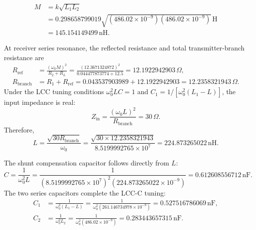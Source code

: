 \documentclass[11pt,a4paper]{article}
\newcommand{\step}[1]{\par\vspace{8pt}{\large\bfseries #1}\par\vspace{2pt}}
\newcommand{\ohm}{\,\Omega}
\newcommand{\nH}{\,\mathrm{nH}}
\newcommand{\nF}{\,\mathrm{nF}}
\begin{document}
\step{4. Mutual inductance M}
\begin{align*}
 M&=k\sqrt{L_1L_2}\\
  &=0.298658799019\sqrt{(486.02\times10^{-9})(486.02\times10^{-9})}\,\mathrm{H}\\
  &=\boxed{145.154149499\nH}.
\end{align*}

\newpage
\step{5. Reflected resistance and compensation inductance L}
At receiver series resonance, the reflected resistance and total
transmitter-branch resistance are
\begin{align*}
 R_{\mathrm{ref}}
   &=\frac{(\omega_0M)^2}{R_2+R_L}
     =\frac{(12.3671324872)^2}{0.044477873774+12.5}
     =12.1922942903\ohm,\\
 R_{\mathrm{branch}}
   &=R_1+R_{\mathrm{ref}}
     =0.043537903989+12.1922942903
     =12.2358321943\ohm.
\end{align*}
Under the LCC tuning conditions
$\omega_0^2LC=1$ and $C_1=1/[\omega_0^2(L_1-L)]$,
the input impedance is real:
\[
 Z_{\mathrm{in}}=\frac{(\omega_0L)^2}{R_{\mathrm{branch}}}=30\ohm.
\]
Therefore,
\[
 L=\frac{\sqrt{30R_{\mathrm{branch}}}}{\omega_0}
  =\frac{\sqrt{30\times12.2358321943}}{8.5199992765\times10^7}
  =\boxed{224.873265022\nH}.
\]

\step{6. Compensation capacitances C, C1 and C2}
The shunt compensation capacitor follows directly from $L$:
\[
 C=\frac{1}{\omega_0^2L}
  =\frac{1}{(8.5199992765\times10^7)^2(224.873265022\times10^{-9})}
  =\boxed{0.612608556712\nF}.
\]
The two series capacitors complete the LCC-C tuning:
\begin{align*}
 C_1&=\frac{1}{\omega_0^2(L_1-L)}
     =\frac{1}{\omega_0^2(261.146734978\times10^{-9})}
     =0.527516786069\nF,\\
 C_2&=\frac{1}{\omega_0^2L_2}
     =\frac{1}{\omega_0^2(486.02\times10^{-9})}
     =0.283443657315\nF.
\end{align*}
\end{document}
